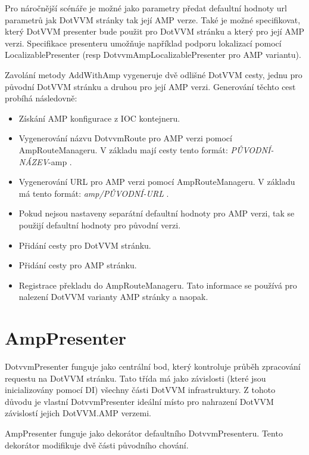 Pro náročnější scénáře je možné jako parametry předat defaultní hodnoty url parametrů jak DotVVM stránky tak její AMP verze. Také je možné specifikovat, který DotVVM presenter bude použit pro DotVVM stránku a který pro její AMP verzi. Specifikace presenteru umožňuje například podporu lokalizací pomocí LocalizablePresenter (resp DotvvmAmpLocalizablePresenter pro AMP variantu).

Zavolání metody AddWithAmp vygeneruje dvě odlišné DotVVM cesty, jednu pro původní DotVVM stránku a druhou pro její AMP verzi.\newline
Generování těchto cest probíhá následovně:
\begin{itemize}
    \item Získání AMP konfigurace z IOC kontejneru.
    \item Vygenerování názvu  DotvvmRoute pro AMP verzi pomocí AmpRouteManageru.\newline
    V základu mají cesty tento formát: \textit{PŮVODNÍ-NÁZEV}-amp .
    \item Vygenerování URL  pro AMP verzi pomocí AmpRouteManageru.\newline
    V základu má tento formát: \textit{amp/PŮVODNÍ-URL} .
    \item Pokud nejsou nastaveny separátní defaultní hodnoty pro AMP verzi, tak se použijí defaultní hodnoty pro původní verzi.
    \item Přidání cesty pro DotVVM stránku.
    \item Přidání cesty pro AMP stránku.
    \item Registrace překladu do AmpRouteManageru.\newline
    Tato informace se používá pro nalezení DotVVM varianty AMP stránky a naopak.
\end{itemize}

\section{AmpPresenter}
DotvvmPresenter funguje jako centrální bod, který kontroluje průběh zpracování requestu na DotVVM stránku. Tato třída má jako závislosti (které jsou inicializovány pomocí DI) všechny části DotVVM infrastruktury. Z tohoto důvodu je vlastní DotvvmPresenter ideální místo pro nahrazení DotVVM závislostí jejich DotVVM.AMP verzemi.

AmpPresenter funguje jako dekorátor defaultního DotvvmPresenteru. Tento dekorátor modifikuje dvě části původního chování.

